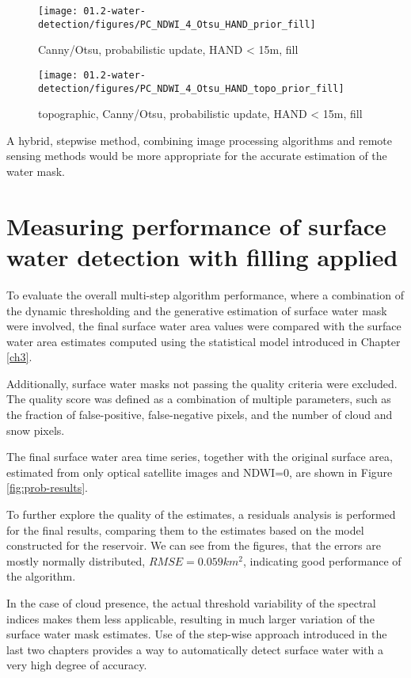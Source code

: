 \begin{figure}
	\centering
	\texttt{[image: 01.2-water-detection/figures/PC\_NDWI\_4\_Otsu\_HAND\_prior\_fill]}
	\caption{Canny/Otsu, probabilistic update, HAND < 15m, fill}
	\label{fig:r1_canny_otsu_hand_nb_fill}
\end{figure}

\begin{figure}
	\centering
	\texttt{[image: 01.2-water-detection/figures/PC\_NDWI\_4\_Otsu\_HAND\_topo\_prior\_fill]}
	\caption{topographic, Canny/Otsu, probabilistic update, HAND < 15m, fill}
	\label{fig:r1_canny_otsu_topo_hand_nb_fill}
\end{figure}

A hybrid, stepwise method, combining image processing algorithms and remote sensing methods would be more appropriate for the accurate estimation of the water mask.

\newpage


\section{Measuring performance of surface water detection with filling applied}

To evaluate the overall multi-step algorithm performance, where a combination of the dynamic thresholding and the generative estimation of surface water mask were involved, the final surface water area values were compared with the surface water area estimates computed using the statistical model introduced in Chapter \ref{ch3}. 

Additionally, surface water masks not passing the quality criteria were excluded. The quality score was defined as a combination of multiple parameters, such as the fraction of false-positive, false-negative pixels, and the number of cloud and snow pixels. 

The final surface water area time series, together with the original surface area, estimated from only optical satellite images and NDWI=0, are shown in Figure \ref{fig:prob-results}.

To further explore the quality of the estimates, a residuals analysis is performed for the final results, comparing them to the estimates based on the model constructed for the reservoir. We can see from the figures, that the errors are mostly normally distributed, $RMSE=0.059km^2$, indicating good performance of the algorithm.

In the case of cloud presence, the actual threshold variability of the spectral indices makes them less applicable, resulting in much larger variation of the surface water mask estimates. Use of the step-wise approach introduced in the last two chapters provides a way to automatically detect surface water with a very high degree of accuracy.


